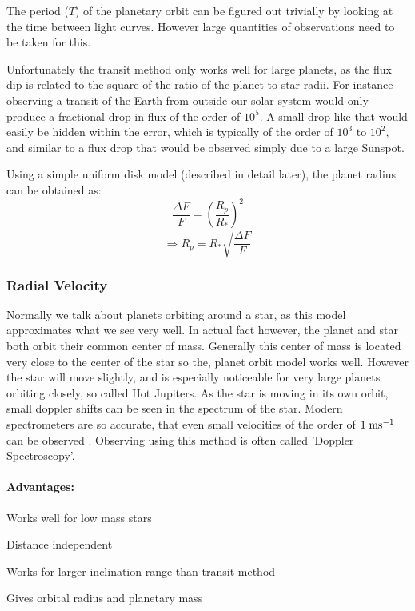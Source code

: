 The period ($T$) of the planetary orbit can be figured out trivially by looking at the time between light curves. However large quantities of observations need to be taken for this.

Unfortunately the transit method only works well for large planets, as the flux dip is related to the square of the ratio of the planet to star radii. For instance observing a transit of the Earth from outside our solar system would only produce a fractional drop in flux of the order of $10^5$. A small drop like that would easily be hidden within the error, which is typically of the order of $10^3$ to $10^2$, and similar to a flux drop that would be observed simply due to a large Sunspot.

Using a simple uniform disk model (described in detail later), the planet radius can be obtained as:
\[ \frac{\Delta F}{F} = \left( \frac{R_p}{R_*} \right)^2 \]
\[ \Rightarrow R_p = R_* \sqrt{\frac{\Delta F}{F}} \]

\subsubsection{Radial Velocity}

Normally we talk about planets orbiting around a star, as this model approximates what we see very well. In actual fact however, the planet and star both orbit their common center of mass. Generally this center of mass is located very close to the center of the star so the, planet orbit model works well. However the star will move slightly, and is especially noticeable for very large planets orbiting closely, so called Hot Jupiters. As the star is moving in its own orbit, small doppler shifts can be seen in the spectrum of the star. Modern spectrometers are so accurate, that even small velocities of the order of $1\;\mathrm{ms^{-1}}$ can be observed \citep{ge2002externally}. Observing using this method is often called 'Doppler Spectroscopy'.

\paragraph{Advantages:}
\begin{itemize*}
    \item Works well for low mass stars
    \item Distance independent
    \item Works for larger inclination range than transit method
    \item Gives orbital radius and planetary mass
\end{itemize*}

